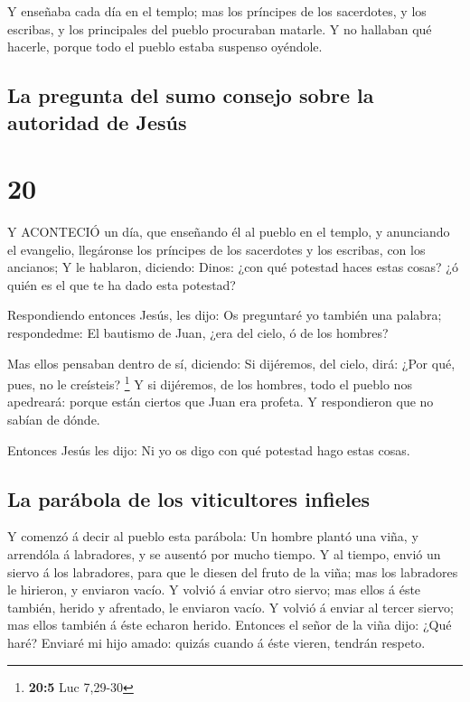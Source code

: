  Y enseñaba cada día en el templo; mas los príncipes de los
sacerdotes, y los escribas, y los principales del pueblo procuraban
matarle.  Y no hallaban qué hacerle, porque todo el pueblo
estaba suspenso oyéndole.

\hypertarget{la-pregunta-del-sumo-consejo-sobre-la-autoridad-de-jesuxfas}{%
\subsection{La pregunta del sumo consejo sobre la autoridad de
Jesús}\label{la-pregunta-del-sumo-consejo-sobre-la-autoridad-de-jesuxfas}}

\hypertarget{section-19}{%
\section{20}\label{section-19}}

 Y ACONTECIÓ un día, que enseñando él al pueblo en el
templo, y anunciando el evangelio, llegáronse los príncipes de los
sacerdotes y los escribas, con los ancianos;  Y le hablaron,
diciendo: Dinos: ¿con qué potestad haces estas cosas? ¿ó quién es el que
te ha dado esta potestad?

 Respondiendo entonces Jesús, les dijo: Os preguntaré yo
también una palabra; respondedme:  El bautismo de Juan, ¿era
del cielo, ó de los hombres?

 Mas ellos pensaban dentro de sí, diciendo: Si dijéremos,
del cielo, dirá: ¿Por qué, pues, no le creísteis? \footnote{\textbf{20:5}
  Luc 7,29-30}  Y si dijéremos, de los hombres, todo el
pueblo nos apedreará: porque están ciertos que Juan era profeta.
 Y respondieron que no sabían de dónde.

 Entonces Jesús les dijo: Ni yo os digo con qué potestad
hago estas cosas.

\hypertarget{la-paruxe1bola-de-los-viticultores-infieles}{%
\subsection{La parábola de los viticultores
infieles}\label{la-paruxe1bola-de-los-viticultores-infieles}}

 Y comenzó á decir al pueblo esta parábola: Un hombre plantó
una viña, y arrendóla á labradores, y se ausentó por mucho tiempo.
 Y al tiempo, envió un siervo á los labradores, para que le
diesen del fruto de la viña; mas los labradores le hirieron, y enviaron
vacío.  Y volvió á enviar otro siervo; mas ellos á éste
también, herido y afrentado, le enviaron vacío.  Y volvió á
enviar al tercer siervo; mas ellos también á éste echaron herido.
 Entonces el señor de la viña dijo: ¿Qué haré? Enviaré mi
hijo amado: quizás cuando á éste vieren, tendrán respeto.


